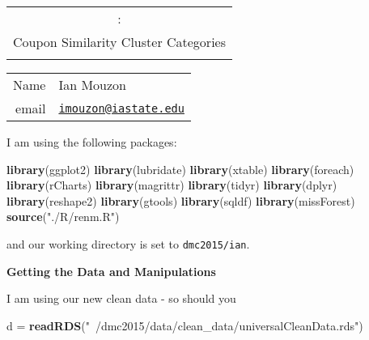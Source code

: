 \documentclass[10pt]{report}
\newenvironment{Shaded}{}{}
\newcommand{\KeywordTok}[1]{\textcolor[rgb]{0.00,0.44,0.13}{\textbf{{#1}}}}
\newcommand{\StringTok}[1]{\textcolor[rgb]{0.25,0.44,0.63}{{#1}}}
\newcommand{\NormalTok}[1]{{#1}}
\begin{document}
\thispagestyle{empty}%
\begin{center}%
    \renewcommand{\arraystretch}{1.5}%
    \begin{tabular}{c}%
       \Large{: }\\
       Coupon Similarity Cluster Categories\\
         \\
    \end{tabular}
\end{center}

\begin{center}
 \renewcommand{\arraystretch}{1.5}
 \begin{tabular*}{0.65\textwidth}{r@{:\hspace{.3cm}}l}
    \hline
     Name& Ian Mouzon\\
     email& \href{mailto:imouzon@iastate.edu}{\nolinkurl{imouzon@iastate.edu}}\\
    
    
    
    \hline
 \end{tabular*}
\end{center}

I am using the following packages:

\begin{Shaded}
\begin{Highlighting}[]
   \KeywordTok{library}\NormalTok{(ggplot2)}
   \KeywordTok{library}\NormalTok{(lubridate)}
   \KeywordTok{library}\NormalTok{(xtable)}
   \KeywordTok{library}\NormalTok{(foreach)}
   \KeywordTok{library}\NormalTok{(rCharts)}
   \KeywordTok{library}\NormalTok{(magrittr)}
   \KeywordTok{library}\NormalTok{(tidyr)}
   \KeywordTok{library}\NormalTok{(dplyr)}
   \KeywordTok{library}\NormalTok{(reshape2)}
   \KeywordTok{library}\NormalTok{(gtools)}
   \KeywordTok{library}\NormalTok{(sqldf)}
   \KeywordTok{library}\NormalTok{(missForest)}
   \KeywordTok{source}\NormalTok{(}\StringTok{"./R/renm.R"}\NormalTok{)}
\end{Highlighting}
\end{Shaded}

and our working directory is set to \verb!dmc2015/ian!.

\textbf{Getting the Data and Manipulations}

I am using our new clean data - so should you

\begin{Shaded}
\begin{Highlighting}[]
   \NormalTok{d =}\StringTok{ }\KeywordTok{readRDS}\NormalTok{(}\StringTok{"~/dmc2015/data/clean_data/universalCleanData.rds"}\NormalTok{)}
\end{Highlighting}
\end{Shaded}
\end{document}

